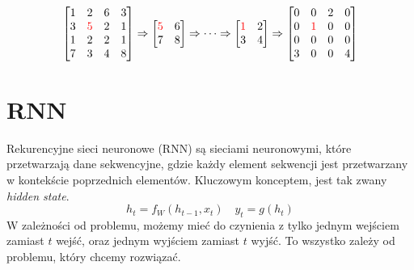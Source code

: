 \documentclass{../notatki}
\begin{document}
\begin{examplebox}
  $$
  \begin{bmatrix}
    1 & 2 & 6 & 3 \\
    3 & \textcolor{red}{5} & 2 & 1 \\
    1 & 2 & 2 & 1 \\
    7 & 3 & 4 & 8
  \end{bmatrix} \Rightarrow
  \begin{bmatrix}
    \textcolor{red}{5} & 6 \\
    7 & 8
  \end{bmatrix}
  \Rightarrow \dots \Rightarrow
  \begin{bmatrix}
    \textcolor{red}{1} & 2 \\
    3 & 4
  \end{bmatrix}
  \Rightarrow
  \begin{bmatrix}
    0 & 0 & 2 & 0 \\
    0 & \textcolor{red}{1} & 0 & 0 \\
    0 & 0 & 0 & 0 \\
    3 & 0 & 0 & 4
  \end{bmatrix}
  $$
\end{examplebox}

\section{RNN}

Rekurencyjne sieci neuronowe (RNN) są sieciami neuronowymi, które przetwarzają
dane sekwencyjne, gdzie każdy element sekwencji jest przetwarzany w kontekście
poprzednich elementów. Kluczowym konceptem, jest tak zwany
\textit{hidden state}.
$$
h_t = f_W(h_{t-1}, x_t) \quad y_t = g(h_t)
$$
W zależności od problemu, możemy mieć do czynienia z tylko jednym
wejściem zamiast $t$ wejść, oraz jednym wyjściem zamiast $t$ wyjść. To wszystko
zależy od problemu, który chcemy rozwiązać.
\end{document}
